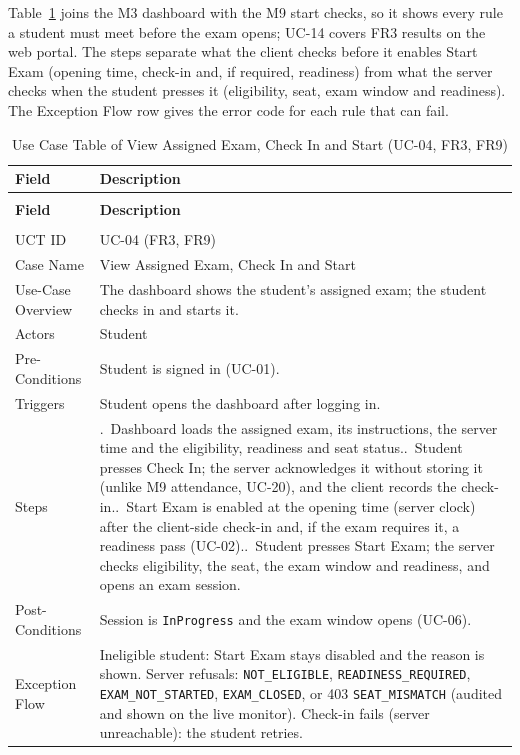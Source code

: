 Table~\ref{tab:uct_start_exam} joins the M3 dashboard with the M9 start checks, so it shows every rule a student must meet before the exam opens; UC-14 covers FR3 results on the web portal. The steps separate what the client checks before it enables Start Exam (opening time, check-in and, if required, readiness) from what the server checks when the student presses it (eligibility, seat, exam window and readiness). The Exception Flow row gives the error code for each rule that can fail.

{\renewcommand{\arraystretch}{1.1}\setlength{\tabcolsep}{6pt}
\begin{longtable}{>{\small\raggedright\arraybackslash}p{3.3cm}>{\small\raggedright\arraybackslash}p{\dimexpr\textwidth-3.3cm-4\tabcolsep\relax}}
\caption{Use Case Table of View Assigned Exam, Check In and Start (UC-04, FR3, FR9)}\label{tab:uct_start_exam}\\ \hline\hline
\textbf{Field} & \textbf{Description} \\ \hline\hline
\endfirsthead
\multicolumn{2}{c}{\small\tablename~\thetable{} -- continued from previous page}\\ \hline\hline
\textbf{Field} & \textbf{Description} \\ \hline\hline
\endhead
\hline \multicolumn{2}{r}{\small Continued on next page}\\
\endfoot
\hline\hline
\endlastfoot
UCT ID & UC-04 (FR3, FR9) \\*
Case Name & View Assigned Exam, Check In and Start \\*
Use-Case Overview & The dashboard shows the student's assigned exam; the student checks in and starts it. \\*
Actors & Student \\*
Pre-Conditions & Student is signed in (UC-01). \\*
Triggers & Student opens the dashboard after logging in. \\
Steps & 1.~Dashboard loads the assigned exam, its instructions, the server time and the eligibility, readiness and seat status.\newline
2.~Student presses Check In; the server acknowledges it without storing it (unlike M9 attendance, UC-20), and the client records the check-in.\newline
3.~Start Exam is enabled at the opening time (server clock) after the client-side check-in and, if the exam requires it, a readiness pass (UC-02).\newline
4.~Student presses Start Exam; the server checks eligibility, the seat, the exam window and readiness, and opens an exam session. \\
Post-Conditions & Session is \texttt{InProgress} and the exam window opens (UC-06). \\
Exception Flow & Ineligible student: Start Exam stays disabled and the reason is shown. Server refusals: \texttt{NOT\_ELIGIBLE}, \texttt{READINESS\_REQUIRED}, \texttt{EXAM\_NOT\_STARTED}, \texttt{EXAM\_CLOSED}, or 403 \texttt{SEAT\_MISMATCH} (audited and shown on the live monitor). Check-in fails (server unreachable): the student retries. \\
\end{longtable}}

